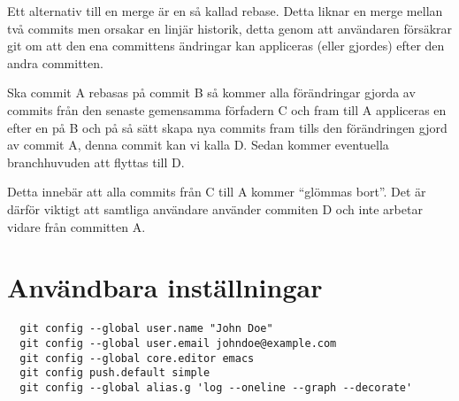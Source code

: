\documentclass[a4paper,12pt]{article}
\begin{document}
Ett alternativ till en merge är en så kallad rebase.
Detta liknar en merge mellan två commits men orsakar en linjär historik, detta genom att användaren försäkrar git om att den ena committens ändringar kan appliceras (eller gjordes) efter den andra committen.

Ska commit A rebasas på commit B så kommer alla förändringar gjorda av commits från den senaste gemensamma förfadern C och fram till A appliceras en efter en på B och på så sätt skapa nya commits fram tills den förändringen gjord av commit A, denna commit kan vi kalla D.
Sedan kommer eventuella branchhuvuden att flyttas till D.

Detta innebär att alla commits från C till A kommer ``glömmas bort''. 
Det är därför viktigt att samtliga användare använder commiten D och inte arbetar vidare från committen A.

\section{Användbara inställningar}

\begin{lstlisting}
  git config --global user.name "John Doe"
  git config --global user.email johndoe@example.com
  git config --global core.editor emacs
  git config push.default simple
  git config --global alias.g 'log --oneline --graph --decorate'
\end{lstlisting}
\end{document}
